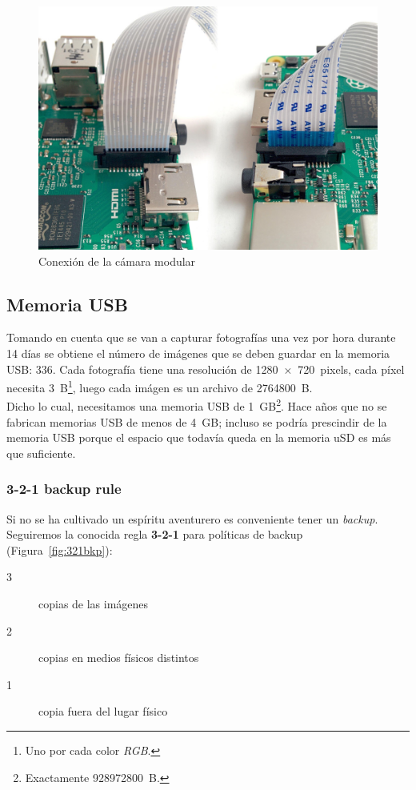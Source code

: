 \documentclass[10pt,a4paper]{article}
\begin{document}
\begin{figure}
\centering
    \includegraphics[scale=0.15]{connect-camera.jpg}
    \caption{Conexi\'on de la c\'amara modular}
    \label{fig:ribbon}
\end{figure}

\subsection{Memoria USB}

Tomando en cuenta que se van a capturar fotograf\'ias una vez por hora durante 14 d\'ias se obtiene el n\'umero de im\'agenes que se deben guardar en la memoria USB: $336$. Cada fotograf\'ia tiene una resoluci\'on de \SI{1280x720}{pixels}, cada p\'ixel necesita \SI{3}{B}\footnote{Uno por cada color \emph{RGB}.}, luego cada im\'agen es un archivo de \SI{2764800}{B}.\\

Dicho lo cual, necesitamos una memoria USB de \SI{1}{GB}\footnote{Exactamente \SI{928972800}{B}.}. Hace a\~nos que no se fabrican memorias USB de menos de \SI{4}{GB}; incluso se podr\'ia prescindir de la memoria USB porque el espacio que todav\'ia queda en la memoria uSD es m\'as que suficiente.

\subsubsection{3-2-1 backup rule}

Si no se ha cultivado un esp\'iritu aventurero es conveniente tener un \emph{backup}. Seguiremos la conocida regla \textbf{3-2-1} para pol\'iticas de backup (Figura~\ref{fig:321bkp}):
\begin{description}
    \item [3] copias de las im\'agenes
    \item [2] copias en medios f\'isicos distintos
    \item [1] copia fuera del lugar f\'isico
\end{description}
\end{document}
